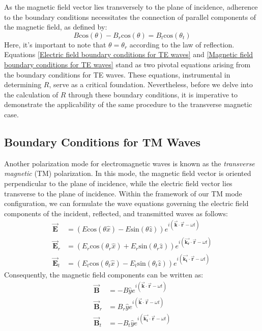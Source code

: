 As the magnetic field vector lies transversely to the plane of incidence, adherence to the boundary conditions necessitates the connection of parallel components of the magnetic field, as defined by:
\begin{equation} \label{Magnetic field boundary conditions for TE waves}
B\mathrm{cos}(\theta) - B_r\mathrm{cos}(\theta) = B_t\mathrm{cos}(\theta_t) 
\end{equation}
Here, it's important to note that $\theta = \theta_r$ according to the law of reflection. Equations \ref{Electric field boundary conditions for TE waves} and \ref{Magnetic field boundary conditions for TE waves} stand as two pivotal equations arising from the boundary conditions for TE waves. These equations, instrumental in determining $R$, serve as a critical foundation. Nevertheless, before we delve into the calculation of $R$ through these boundary conditions, it is imperative to demonstrate the applicability of the same procedure to the transverse magnetic case.

\subsection{Boundary Conditions for TM Waves}
Another polarization mode for electromagnetic waves is known as the \textit{transverse magnetic} (TM) polarization. In this mode, the magnetic field vector is oriented perpendicular to the plane of incidence, while the electric field vector lies transverse to the plane of incidence. Within the framework of our TM mode configuration, we can formulate the wave equations governing the electric field components of the incident, reflected, and transmitted waves as follows:
\begin{align*} 
\vec{\mathbf{E}} &= (E\mathrm{cos}(\theta \hat{x}) - E\mathrm{sin}(\theta \hat{z})) e^{i(\vec{\mathbf{k}} \cdot \vec{\mathbf{r}} - \omega t)} \\
\vec{\mathbf{E}}_r &= (E_r\mathrm{cos}(\theta_r \hat{x}) + E_r\mathrm{sin}(\theta_r \hat{z})) e^{i(\vec{\mathbf{k_r}} \cdot \vec{\mathbf{r}} - \omega t)} \\ 
\vec{\mathbf{E}}_t &= (E_t\mathrm{cos}(\theta_t \hat{x}) - E_t\mathrm{sin}(\theta_t \hat{z})) e^{i(\vec{\mathbf{k_t}} \cdot \vec{\mathbf{r}} - \omega t)}
\end{align*}
Consequently, the magnetic field components can be written as:
\begin{align*}
    \vec{\mathbf{B}} &= -B\hat{y} e^{i(\vec{\mathbf{k}} \cdot \vec{\mathbf{r}} - \omega t)} \\
    \vec{\mathbf{B}}_r &= B_r\hat{y} e^{i(\vec{\mathbf{k}} \cdot \vec{\mathbf{r}} - \omega t)} \\
    \vec{\mathbf{B}}_t &= -B_t\hat{y} e^{i(\vec{\mathbf{k_t}} \cdot \vec{\mathbf{r}} - \omega t)} \\
\end{align*}

